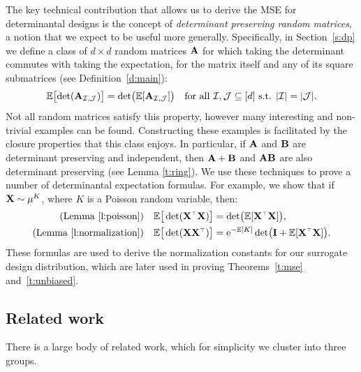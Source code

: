 \documentclass[11pt]{article}
\begin{document}
The key technical contribution that allows us to derive the MSE for determinantal designs is the concept of \emph{determinant preserving random matrices}, a notion that we expect to be useful more generally. 
Specifically, in Section~\ref{s:dp} we define a class of $d\times d$ random
matrices $\mathbf A$ for which taking the determinant commutes with taking
the expectation, for the matrix itself and any of its square submatrices (see Definition~\ref{d:main}):
\begin{align*}
  \mathbb E\big[\!\det(\mathbf A_{\mathcal I,\mathcal{J}})\big] =
  \det\!\big(\mathbb E[\mathbf A_{\mathcal I,\mathcal{J}}]\big)\quad \text{for all }\mathcal I,\mathcal{J}\subseteq
  [d]\text{ s.t. }|\mathcal I|=|\mathcal{J}|.
\end{align*}
  Not all random matrices satisfy this property, however many
interesting and non-trivial examples can be found. Constructing
these examples is facilitated by the closure properties that this
class enjoys. In particular, if $\mathbf A$ and $\mathbf B$ are determinant
preserving and independent, then $\mathbf A+\mathbf B$ and $\mathbf A\mathbf B$ are also
determinant preserving (see Lemma \ref{t:ring}). We use these
techniques to prove a number of determinantal expectation
formulas. For example, we show that if $\mathbf X\sim\mu^K$, where $K$ is a
Poisson random variable, then:
\begin{align*}
  \text{(Lemma \ref{l:poisson})}\quad  \E\big[\det(\X^\top\X)\big]
  &= \det\!\big(\E[\X^\top\X]\big),\\
\text{(Lemma \ref{l:normalization})}\quad  \E\big[\det(\X\X^\top)\big]
&= \ee^{-\E[K]}\det\!\big(\I + \E[\X^\top\X]\big). 
\end{align*}
These formulas are used to derive the normalization constants for our
surrogate design distribution, which are later used in proving
Theorems~\ref{t:mse} and~\ref{t:unbiased}.  


\subsection{Related work}
\label{s:related-work}

There is a large body of related work, which for simplicity we cluster into three groups.
\end{document}
